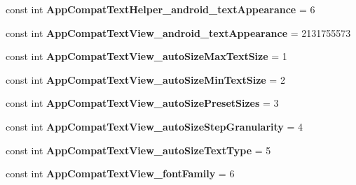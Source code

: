 \begin{DoxyCompactItemize}
\mbox{\label{classst_delivery_1_1_resource_1_1_styleable_a1173b35e73802b9c358547c577703ed7}} 
const int {\bfseries App\+Compat\+Text\+Helper\+\_\+android\+\_\+text\+Appearance} = 6
\item 
\mbox{\label{classst_delivery_1_1_resource_1_1_styleable_ac450f80b762616dc95bb3448a2a1d5cb}} 
const int {\bfseries App\+Compat\+Text\+View\+\_\+android\+\_\+text\+Appearance} = 2131755573
\item 
\mbox{\label{classst_delivery_1_1_resource_1_1_styleable_aea2df3a8f3955b8e684d3b9bbd60c027}} 
const int {\bfseries App\+Compat\+Text\+View\+\_\+auto\+Size\+Max\+Text\+Size} = 1
\item 
\mbox{\label{classst_delivery_1_1_resource_1_1_styleable_a6e0f58e13094f39c47f814d680239f8d}} 
const int {\bfseries App\+Compat\+Text\+View\+\_\+auto\+Size\+Min\+Text\+Size} = 2
\item 
\mbox{\label{classst_delivery_1_1_resource_1_1_styleable_a1d16c6a6d0dbb4033cf9f1f79b26d729}} 
const int {\bfseries App\+Compat\+Text\+View\+\_\+auto\+Size\+Preset\+Sizes} = 3
\item 
\mbox{\label{classst_delivery_1_1_resource_1_1_styleable_a9a428522a1c49239fd411cda09946c89}} 
const int {\bfseries App\+Compat\+Text\+View\+\_\+auto\+Size\+Step\+Granularity} = 4
\item 
\mbox{\label{classst_delivery_1_1_resource_1_1_styleable_aa058060906565feaae369443fa61f9ca}} 
const int {\bfseries App\+Compat\+Text\+View\+\_\+auto\+Size\+Text\+Type} = 5
\item 
\mbox{\label{classst_delivery_1_1_resource_1_1_styleable_ad35b33e3a5313fcfedea6cd140871c00}} 
const int {\bfseries App\+Compat\+Text\+View\+\_\+font\+Family} = 6
\item 
\mbox{\label{classst_delivery_1_1_resource_1_1_styleable_a020a7144bdb927a4e4870cdb2d4f4d90}} 

\end{DoxyCompactItemize}
